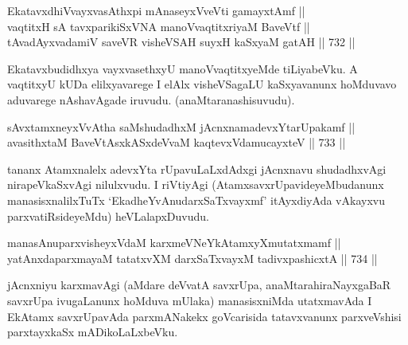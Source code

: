 
\begin{shl}
EkatavxdhiVvayxvasAthx\s pi mAnaseyxVveVti gamayxtAmf ||  \\
vaqtitxH sA tavxparikiSxVNA manoVvaqtitxriyaM BaveVtf || \\
tAvadAyxvadamiV saveVR visheVSAH suyxH kaSxyaM gatAH \hfill || 732 ||  
\end{shl}

\begin{artha} 
Ekatavxbudidhxya vayxvasethxyU manoVvaqtitxyeMde tiLiyabeVku. A 
vaqtitxyU kUDa elilxyavarege I elAlx visheVSagaLU kaSxyavanunx hoMduvavo 
aduvarege nAshavAgade iruvudu. (anaMtara\break nashisuvudu).
\end{artha}


\begin{shl}
sAvxtamxneyxVvAtha saMshudadhxM jAcnxnamadevxYtarUpakamf || \\
avasithxtaM BaveVtAsxkASxdeVvaM kaqtevxVdamucayxteV \hfill || 733 ||  
\end{shl}

\begin{artha} 
tananx Atamxnalelx adevxYta rUpavuLaLxdAdxgi jAcnxnavu shudadhxvAgi 
nirapeVkaSxvAgi nilulxvudu. I riVtiyAgi (AtamxsavxrUpavideyeMbudanunx 
manasisxnalilxTuTx `EkadheYvAnudarxSaTxvayxmf' itAyxdiyAda vAkayxvu\break
parxvatiRsideyeMdu) heVLalapxDuvudu.
\end{artha}


\begin{shl}
manasA\s nuparxvisheyxVdaM karxmeVNeYkAtamxyXmutatxmamf || \\
yatAnxdaparxmayaM tatatxvXM darxSaTxvayxM tadivxpashicxtA \hfill || 734 ||  
\end{shl}

\begin{artha} 
jAcnxniyu karxmavAgi (aMdare deVvatA savxrUpa, anaMtara\break hiraNayxgaBaR 
savxrUpa ivugaLanunx hoMduva mUlaka) manasisxniMda utatxmavAda I 
EkAtamx savxrUpavAda parxmANakekx goVcarisida tatavxvanunx 
parxveVshisi parxtayxkaSx mADikoLaLxbeVku.
\end{artha}


